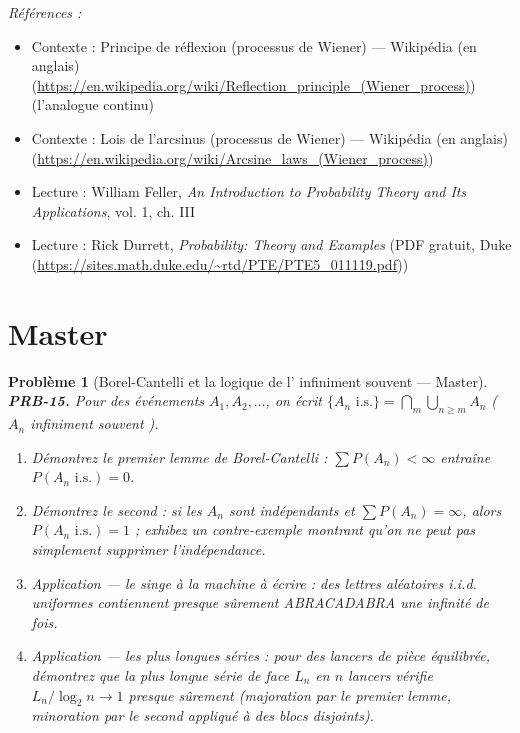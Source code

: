 \documentclass[11pt]{article}
\newtheorem{problem}{Problème}
\newenvironment{refs}{\par\small\noindent\emph{Références :}\begin{itemize}\setlength\itemsep{0pt}}{\end{itemize}\normalsize}
\begin{document}
\begin{refs}
\item Contexte : Principe de réflexion (processus de Wiener) --- Wikipédia (en anglais) (\url{https://en.wikipedia.org/wiki/Reflection_principle_(Wiener_process)}) (l'analogue continu)
\item Contexte : Lois de l'arcsinus (processus de Wiener) --- Wikipédia (en anglais) (\url{https://en.wikipedia.org/wiki/Arcsine_laws_(Wiener_process)})
\item Lecture : William Feller, \textit{An Introduction to Probability Theory and Its Applications}, vol. 1, ch. III
\item Lecture : Rick Durrett, \textit{Probability: Theory and Examples} (PDF gratuit, Duke (\url{https://sites.math.duke.edu/~rtd/PTE/PTE5_011119.pdf}))
\end{refs}

\bigskip


\section*{Master}

\begin{problem}[{Borel-Cantelli et la logique de l'\og{} infiniment souvent \fg{} --- Master}]
\textbf{PRB-15.} Pour des événements $ A_1, A_2, \dots $, on écrit
$ \{A_n \text{ i.s.}\} = \bigcap_m \bigcup_{n\ge m} A_n $ (\og{} $ A_n $ infiniment souvent \fg{}).
\begin{enumerate}
\item[(i)] Démontrez le premier lemme de Borel-Cantelli : $ \sum P(A_n) < \infty $ entraîne
$ P(A_n \text{ i.s.}) = 0 $.
\item[(ii)] Démontrez le second : si les $ A_n $ sont indépendants et $ \sum P(A_n) = \infty $, alors
$ P(A_n \text{ i.s.}) = 1 $ ; exhibez un contre-exemple montrant qu'on ne peut pas simplement
supprimer l'indépendance.
\item[(iii)] Application --- le singe à la machine à écrire : des lettres aléatoires i.i.d. uniformes
contiennent presque sûrement \og{} ABRACADABRA \fg{} une infinité de fois.
\item[(iv)] Application --- les plus longues séries : pour des lancers de pièce équilibrée, démontrez que la
plus longue série de \og{} face \fg{} $ L_n $ en $ n $ lancers vérifie $ L_n / \log_2 n \to 1 $
presque sûrement (majoration par le premier lemme, minoration par le second appliqué à des blocs
disjoints).
\end{enumerate}

\end{problem}
\end{document}
